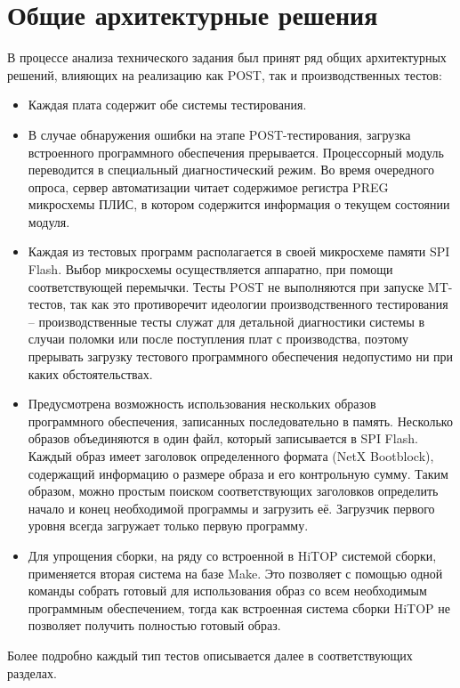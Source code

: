 \documentclass[a4paper,14pt,bachelor]{disser}
\begin{document}
\section{Общие архитектурные решения}
В процессе анализа технического задания был принят ряд общих архитектурных решений, влияющих на реализацию как POST, так и производственных тестов:
\begin{itemize}
 \item Каждая плата содержит обе системы тестирования.
 \item В случае обнаружения ошибки на этапе POST-тестирования, загрузка встроенного программного обеспечения прерывается. Процессорный модуль переводится в специальный диагностический режим. Во время очередного опроса, сервер автоматизации читает содержимое регистра PREG микросхемы ПЛИС, в котором содержится информация о текущем состоянии модуля.
 \item Каждая из тестовых программ располагается в своей микросхеме памяти SPI Flash. Выбор микросхемы осуществляется аппаратно, при помощи соответствующей перемычки. Тесты POST не выполняются при запуске MT-тестов, так как это противоречит идеологии производственного тестирования -- производственные тесты служат для детальной диагностики системы в случаи поломки или после поступления плат с производства, поэтому прерывать загрузку тестового программного обеспечения недопустимо ни при каких обстоятельствах.
 \item Предусмотрена возможность использования нескольких образов программного обеспечения, записанных последовательно в память. Несколько образов объединяются в один файл, который записывается в SPI Flash. Каждый образ имеет заголовок определенного формата (NetX Bootblock), содержащий информацию о размере образа и его контрольную сумму. Таким образом, можно простым поиском соответствующих заголовков определить начало и конец необходимой программы и загрузить её. Загрузчик первого уровня всегда загружает только первую программу.
 \item Для упрощения сборки, на ряду со встроенной в HiTOP системой сборки, применяется вторая система на базе Make\cite{make}. Это позволяет с помощью одной команды собрать готовый для использования образ со всем необходимым программным обеспечением, тогда как встроенная система сборки HiTOP не позволяет получить полностью готовый образ.
\end{itemize}

Более подробно каждый тип тестов описывается далее в соответствующих разделах.
\end{document}

